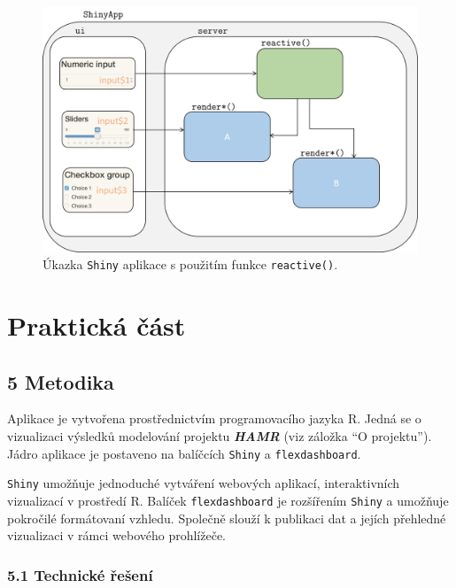 \documentclass[12pt,]{article}
\begin{document}
\begin{figure}[H]
  \centering
      \includegraphics[width=\textwidth]{fig/shiny}
      \caption{Úkazka \texttt{Shiny} aplikace s použitím funkce \texttt{reactive()}.} 
      \label{fig04}
\end{figure}

\newpage

\section*{Praktická část}\label{prakticka-cast}

\subsection{5 Metodika}\label{metodika}

Aplikace je vytvořena prostřednictvím programovacího jazyka R. Jedná se
o vizualizaci výsledků modelování projektu \textbf{\emph{HAMR}} (viz
záložka \enquote{O projektu}). Jádro aplikace je postaveno na balíčcích
\texttt{Shiny} a \texttt{flexdashboard}.

\texttt{Shiny} umožňuje jednoduché vytváření webových aplikací,
interaktivních vizualizací v prostředí R. Balíček \texttt{flexdashboard}
je rozšířením \texttt{Shiny} a umožňuje pokročilé formátovaní vzhledu.
Společně slouží k publikaci dat a jejích přehledné vizualizaci v rámci
webového prohlížeče.

\subsubsection{5.1 Technické řešení}\label{technicke-reseni}
\end{document}
